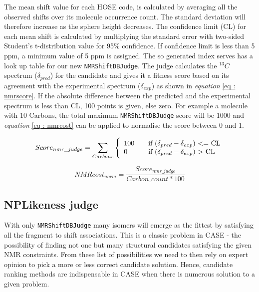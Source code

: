 \documentclass[10pt]{bmc_article}
\newenvironment{bmcformat}{\begin{raggedright}\baselineskip20pt\sloppy\setboolean{publ}{false}}{\end{raggedright}\baselineskip20pt\sloppy}
\begin{document}
\begin{bmcformat}
The mean shift value for each HOSE code, is calculated by averaging all the observed shifts over its molecule occurrence count. The standard deviation will therefore increase as the sphere height decreases. The confidence limit (CL) for each mean shift is calculated by multiplying the standard error with two-sided Student's t-distribution value for  95\% confidence.  If confidence limit is less than 5 ppm, a minimum value of  5 ppm is assigned.  The so generated index serves has a look up table for our new \texttt{NMRShiftDBJudge}. The judge calculates the $^{13}C$ spectrum ($\delta_{pred}$) for the candidate and gives it a fitness score based on its agreement with the experimental spectrum ($\delta_{exp}$) as shown in \emph{equation} \ref{eq : nmrscore}. If the absolute difference between the predicted and the experimental spectrum is less than CL, 100 points is given, else zero. For example a molecule with 10 Carbons, the total maximum \texttt{NMRShiftDBJudge} score will be 1000 and  \emph{equation} \ref{eq : nmrcost} can be applied to normalise the score between 0 and 1. 

   
  \begin{equation}
   Score_{nmr\_judge} = \sum_{Carbons} \Bigg\{
  \begin{array}{l l}
    100 & \quad \textrm{if $(\delta_{pred} - \delta_{exp})$ $<=$ CL} \\
    0 & \quad \textrm{if $(\delta_{pred} - \delta_{exp})$ $>$ CL}   
   \end{array} 
    \label{eq : nmrscore}
  \end{equation}
  
  
  
 
 \begin{equation}
NMRcost_{norm} = \frac{Score_{nmr\_judge}}{Carbon\_count * 100}
\label{eq : nmrcost}  
 \end{equation}
 
 
 
  
\subsection*{NPLikeness judge}

With only  \texttt{NMRShiftDBJudge} many isomers will emerge as the fittest by satisfying all the fragment to shift associations. This is a classic problem in CASE - the possibility of finding not one but many structural candidates satisfying the given NMR constraints. From these list of possibilities we need to then rely on expert opinion to pick a more or less correct candidate solution. Hence, candidate ranking methods are indispensable in CASE when there is numerous solution to a given problem.


\end{bmcformat}
\end{document}

